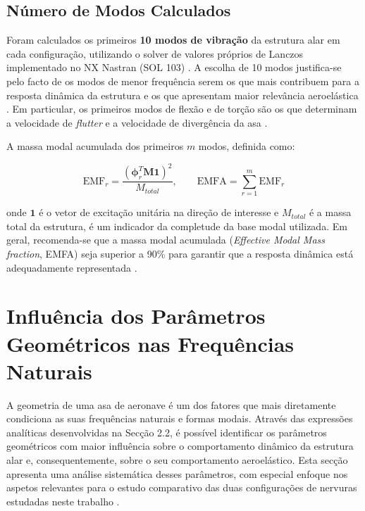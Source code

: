 \documentclass[11pt,twoside,a4paper]{report}
\begin{document}
\subsection{Número de Modos Calculados}

Foram calculados os primeiros \textbf{10 modos de vibração} da estrutura alar em cada configuração, utilizando o solver de valores próprios de Lanczos implementado no NX Nastran (SOL 103) \cite{Nastran2014}. A escolha de 10 modos justifica-se pelo facto de os modos de menor frequência serem os que mais contribuem para a resposta dinâmica da estrutura e os que apresentam maior relevância aeroelástica \cite{Craig2006}. Em particular, os primeiros modos de flexão e de torção são os que determinam a velocidade de \textit{flutter} e a velocidade de divergência da asa \cite{Bisplinghoff1996, Fung1993}.

A massa modal acumulada dos primeiros $m$ modos, definida como:

\begin{equation}
    \text{EMF}_r = \frac{\left( \boldsymbol{\phi}_r^T \mathbf{M} 
    \mathbf{1} \right)^2}{M_{total}}, \qquad 
    \text{EMFA} = \sum_{r=1}^{m} \text{EMF}_r
    \label{eq:emf}
\end{equation}

\noindent onde $\mathbf{1}$ é o vetor de excitação unitária na direção de interesse e $M_{total}$ é a massa total da estrutura, é um indicador da completude da base modal utilizada. Em geral, recomenda-se que a massa modal acumulada (\textit{Effective Modal Mass fraction}, EMFA) seja superior a 90\% para garantir que a resposta dinâmica está adequadamente representada \cite{Craig2006, Nastran2014}.

\section{Influência dos Parâmetros Geométricos nas Frequências Naturais}

A geometria de uma asa de aeronave é um dos fatores que mais diretamente condiciona as suas frequências naturais e formas modais. Através das expressões analíticas desenvolvidas na Secção 2.2, é possível identificar os parâmetros geométricos com maior influência sobre o comportamento dinâmico da estrutura alar e, consequentemente, sobre o seu comportamento aeroelástico. Esta secção apresenta uma análise sistemática desses parâmetros, com especial enfoque nos aspetos relevantes para o estudo comparativo das duas configurações de nervuras estudadas neste trabalho \cite{Bisplinghoff1996, Wright2015}.
\end{document}
